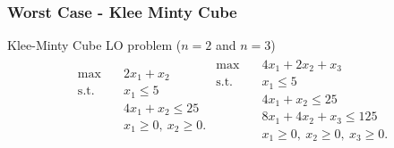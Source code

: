 \documentclass{beamer}
\begin{document}
\begin{frame}
\frametitle{Worst Case - Klee Minty Cube}
Klee-Minty Cube LO problem ($n=2$ and $n=3$)
\begin{align*}
\begin{split}
\max \quad & 2x_1 + x_2 \\
\text{s.t. }\quad  & x_1 \le 5\\
& 4x_1 + x_2 \le 25\\
& x_1 \ge 0,\ x_2 \ge 0.
\end{split}
\begin{split}
\max \quad & 4x_1 + 2x_2 + x_3 \\
\text{s.t. }\quad  & x_1 \le 5\\
& 4x_1 + x_2 \le 25\\
& 8x_1 + 4x_2 + x_3 \le 125\\
& x_1 \ge 0,\ x_2 \ge 0, \ x_3 \ge 0.
\end{split}
\end{align*}
\begin{figure}
\end{figure}

\end{frame}
\end{document}
